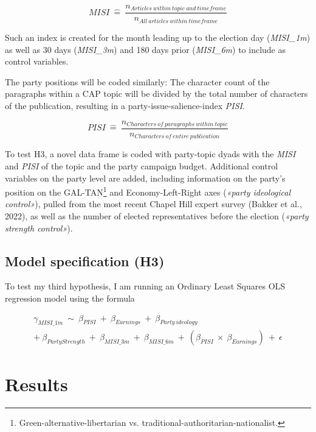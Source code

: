 \documentclass[11pt,a4paper]{article}
\begin{document}
\begin{equation}
    MISI\ \widehat{=}\ \frac{n_{Articles\ within\ topic\ and\ timeframe}}{n_{All\ articles\ within\ timeframe}}
\end{equation}

Such an index is created for the month leading up to the election day (\textit{MISI\_1m}) as well as 30 days (\textit{MISI\_3m}) and 180 days prior (\textit{MISI\_6m}) to include as control variables.

The party positions will be coded similarly: The character count of the paragraphs within a CAP topic will be divided by the total number of characters of the publication, resulting in a party-issue-salience-index \textit{PISI}.

\begin{equation}
    PISI\ \widehat{=}\ \frac{n_{Characters\ of\ paragraphs\ within\ topic}}{n_{Characters\ of\ entire\ publication}}
\end{equation}

To test H3, a novel data frame is coded with party-topic dyads with the \textit{MISI} and \textit{PISI} of the topic and the party campaign budget. Additional control variables on the party level are added, including information on the party’s position on the GAL-TAN\footnote{Green-alternative-libertarian vs. traditional-authoritarian-nationalist.} and Economy-Left-Right axes (\textit{«party ideological control»}), pulled from the most recent Chapel Hill expert survey (Bakker et al., 2022), as well as the number of elected representatives before the election (\textit{«party strength control»}). 


\subsection{Model specification (H3)}
To test my third hypothesis, I am running an Ordinary Least Squares OLS regression model using the formula

\begin{equation}
    \begin{split}
        \gamma_{MISI\_1m}\ \sim\ \beta_{PISI}\ +\ \beta_{Earnings}\ +\ \beta_{Party\ ideology}\\
         +\ \beta_{Party Strength}\ +\ \beta_{MISI\_3m}\ +\ \beta_{MISI\_6m}\ +\ (\beta_{PISI}\ \times\ \beta_{Earnings})\ +\ \epsilon  
    \end{split}
\end{equation}


\section{Results}
\end{document}
